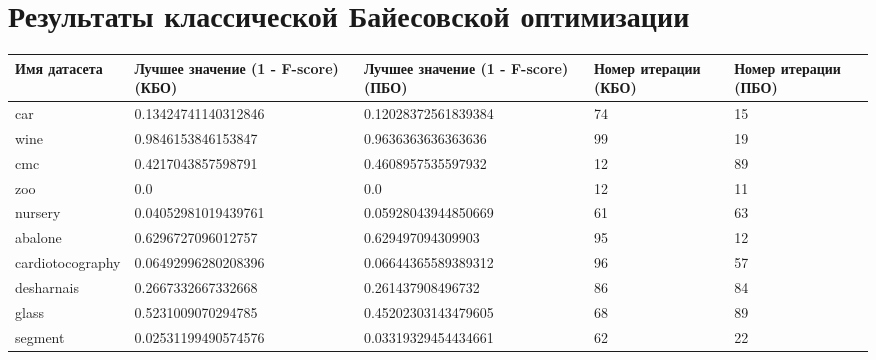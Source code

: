 \documentclass[times,specification,annotation]{itmo-student-thesis}
\begin{document}
	\chapter{Результаты классической Байесовской оптимизации}\label{sec:app:1}
	\begin{center}
		\begin{longtable}{ |m{3.4cm}|m{4.7cm}|m{4.7cm}|m{1.5cm}|m{1.5cm}| } 
		\hline
		\textbf{Имя датасета} & \textbf{Лучшее значение (1 - F-score) (КБО)} & \textbf{Лучшее значение (1 - F-score) (ПБО)} & \textbf{Номер итерации (КБО)} &  \textbf{Номер итерации (ПБО)} \\
		\hline\hline
		car & 0.13424741140312846 & 0.12028372561839384 & 74 & 15 \\
		\hline
		wine & 0.9846153846153847 & 0.9636363636363636 & 99 & 19 \\
		\hline
		cmc & 0.4217043857598791 & 0.4608957535597932 & 12 & 89 \\
		\hline
		zoo & 0.0 & 0.0 & 12 & 11 \\
		\hline
		nursery & 0.04052981019439761 & 0.05928043944850669 & 61 & 63 \\
		\hline
		abalone & 0.6296727096012757 & 0.629497094309903 & 95 & 12 \\
		\hline
		cardiotocography & 0.06492996280208396 & 0.06644365589389312 & 96 & 57 \\
		\hline
		desharnais & 0.2667332667332668 & 0.261437908496732 & 86 & 84 \\
		\hline
		glass & 0.5231009070294785 & 0.45202303143479605 & 68 & 89 \\
		\hline
		segment & 0.02531199490574576 & 0.03319329454434661 & 62 & 22 \\
		\hline
		
		\end{longtable}
	\end{center}
\end{document}
